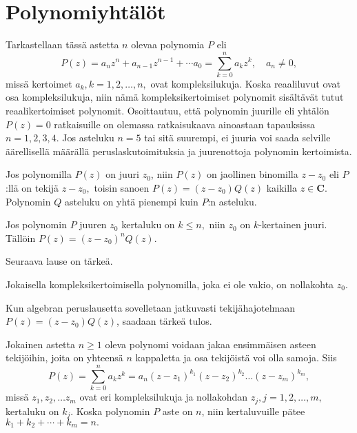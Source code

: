 \documentclass[a4paper, 12pt]{article}
\theoremstyle{remark}
\theoremstyle{definition}
\begin{document}
\clearpage

\section{Polynomiyhtälöt}

Tarkastellaan tässä astetta $n$ olevaa polynomia $P$ eli
$$
P(z)=a_n z^n+a_{n-1}z^{n-1}+\cdots a_0=\sum_{k=0}^n a_k z^k,\quad a_n\neq 0,
$$
missä kertoimet $a_k, k=1,2,\ldots, n,$ ovat kompleksilukuja. Koska reaaliluvut ovat osa kompleksilukuja, niin nämä kompleksikertoimiset polynomit sisältävät tutut reaalikertoimiset polynomit. Osoittautuu, että polynomin juurille eli yhtälön $P(z)=0$ ratkaisuille on olemassa ratkaisukaava ainoastaan tapauksissa $n=1, 2, 3, 4.$ Jos asteluku $n=5$ tai sitä suurempi, ei juuria voi saada selville äärellisellä määrällä peruslaskutoimituksia ja juurenottoja polynomin kertoimista.

\begin{lause}\label{lause: 14} Jos polynomilla $P(z)$ on juuri $z_0$, niin $P(z)$ on jaollinen binomilla $z-z_0$ eli $P$:llä on tekijä $z-z_0,$ toisin sanoen 
$P(z)=(z-z_0)Q(z)$
kaikilla $z\in\mathbf{C}.$ Polynomin $Q$ asteluku on yhtä pienempi kuin $P$:n asteluku.
\end{lause}

\begin{maar} Jos polynomin $P$ juuren $z_0$ kertaluku on $k\leq n,$ niin $z_0$ on $k$-kertainen juuri. Tällöin
$P(z)=(z-z_0)^nQ(z).$
\end{maar}

Seuraava lause on tärkeä.

\begin{lause} Jokaisella kompleksikertoimisella polynomilla, joka ei ole vakio, on nollakohta $z_0.$
\end{lause}

Kun algebran peruslausetta sovelletaan jatkuvasti tekijähajotelmaan $P(z)=(z-z_0)Q(z)$, saadaan tärkeä tulos.

\begin{lause}\label{lause: tekija} Jokainen astetta $n\geq 1$ oleva polynomi voidaan jakaa ensimmäisen asteen tekijöihin, joita on yhteensä $n$ kappaletta ja osa tekijöistä voi olla samoja. Siis
$$
P(z)=\sum_{k=0}^n a_k z^k=a_n(z-z_1)^{k_1}(z-z_2)^{k_2}\ldots (z-z_m)^{k_m},
$$
missä $z_1, z_2,\ldots z_m$ ovat eri kompleksilukuja ja nollakohdan $z_j, j=1,2,\ldots, m,$ kertaluku on $k_j.$ Koska polynomin $P$ aste on $n$, niin kertaluvuille pätee $k_1+k_2+\cdots+k_m=n.$
\end{lause}
\end{document}
